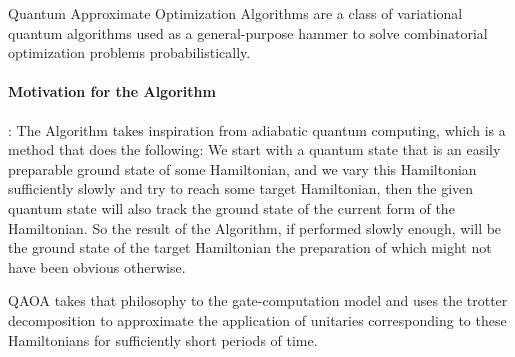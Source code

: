 Quantum Approximate Optimization Algorithms are a class of variational quantum algorithms used as a general-purpose hammer to solve combinatorial optimization problems probabilistically.

\paragraph*{Motivation for the Algorithm}: The Algorithm takes inspiration from adiabatic quantum computing, which is a method that does the following: We start with a quantum state that is an easily preparable ground state of some Hamiltonian, and we vary this Hamiltonian sufficiently slowly and try to reach some target Hamiltonian, then the given quantum state will also track the ground state of the current form of the Hamiltonian. So the result of the Algorithm, if performed slowly enough, will be the ground state of the target Hamiltonian the preparation of which might not have been obvious otherwise.

QAOA takes that philosophy to the gate-computation model and uses the trotter decomposition to approximate the application of unitaries corresponding to these Hamiltonians for sufficiently short periods of time.

